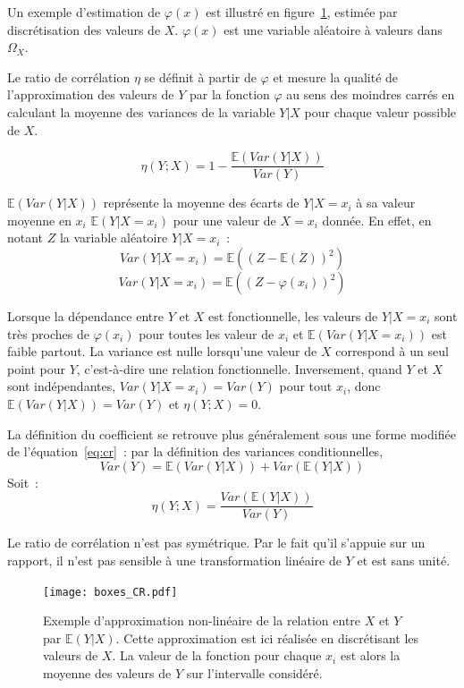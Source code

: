 \documentclass[../main]{subfiles}
\begin{document}
Un exemple d'estimation de $\varphi(x)$ est illustré en figure~\ref{fig:cr_box}, estimée par discrétisation des valeurs de $X$. $\varphi(x)$ est une variable aléatoire à valeurs dans $\Omega_X$.

Le ratio de corrélation $\eta$ se définit à partir de $\varphi$ et mesure la qualité de l'approximation des valeurs de $Y$ par la fonction $\varphi$ au sens des moindres carrés en calculant la moyenne des variances de la variable $Y|X$ pour chaque valeur possible de $X$. 

\begin{equation}\label{eq:cr}
   \eta(Y;X) = 1 - \frac{\mathbb{E}(Var(Y|X))}{Var(Y)}
\end{equation}

$\mathbb{E}(Var(Y|X))$ représente la moyenne des écarts de $Y|X=x_i$ à sa valeur moyenne en $x_i$ $\mathbb{E}(Y|X=x_i)$ pour une valeur de $X = x_i$ donnée. 
En effet, en notant $Z$ la variable aléatoire $Y | X=x_i$~: 
$$ Var(Y|X=x_i) = \mathbb{E}((Z - \mathbb{E}(Z))^2)$$
$$ Var(Y|X=x_i) = \mathbb{E}((Z - \varphi(x_i))^2)$$

Lorsque la dépendance entre $Y$ et $X$ est fonctionnelle, les valeurs de $Y|X = x_i$ sont très proches de $\varphi(x_i)$  pour toutes les valeur de $x_i$ et $\mathbb{E}(Var(Y|X=x_i))$ est faible partout. La variance est nulle lorsqu'une valeur de $X$ correspond à un seul point pour $Y$, c'est-à-dire une relation fonctionnelle. 
Inversement, quand $Y$ et $X$ sont indépendantes, $Var(Y|X=x_i) = Var(Y)$ pour tout $x_i$, donc $\mathbb{E}(Var(Y|X)) = Var(Y)$ et $\eta(Y;X) = 0$.

La définition du coefficient se retrouve plus généralement sous une forme modifiée de l'équation~\ref{eq:cr}~:
par la définition des variances conditionnelles,
$$Var(Y) = \mathbb{E}(Var(Y|X)) + Var(\mathbb{E}(Y|X))$$
Soit~:
\begin{equation}
    \eta(Y;X) = \frac{Var(\mathbb{E}(Y|X))}{Var(Y)}
\end{equation}

Le ratio de corrélation n'est pas symétrique. 
Par le fait qu'il s'appuie sur un rapport, il n'est pas sensible à une transformation linéaire de $Y$ et est sans unité.

\begin{figure}
    \centering
    \texttt{[image: boxes\_CR.pdf]}
    \caption{Exemple d'approximation non-linéaire de la relation entre $X$ et $Y$ par $\mathbb{E}(Y|X)$. Cette approximation est ici réalisée en discrétisant les valeurs de $X$. La valeur de la fonction pour chaque $x_i$ est alors la moyenne des valeurs de $Y$ sur l'intervalle considéré.\label{fig:cr_box}}
\end{figure}
\end{document}
